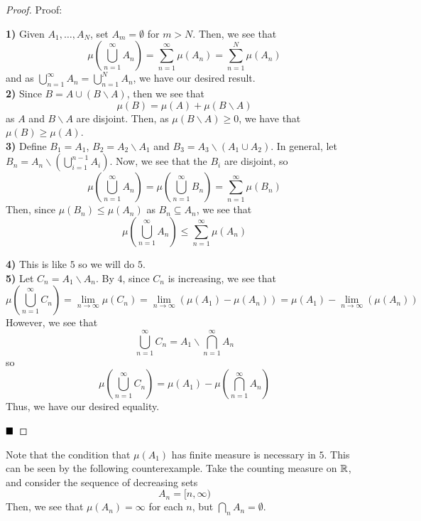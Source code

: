 \begin{proof}{Proof:}
    
    \textbf{1)} Given $A_1, \ldots, A_N$, set $A_m = \emptyset$ for $m > N$. Then, we see that
    \[ \mu\left(\bigcup_{n = 1}^{\infty} A_n\right) = \sum_{n = 1}^{\infty} \mu(A_n) = \sum_{n = 1}^{N} \mu(A_n) \]
    and as $\bigcup_{n = 1}^{\infty} A_n = \bigcup_{n = 1}^{N} A_n$, we have our desired result.\\

    \textbf{2)} Since $B = A \cup (B \backslash A)$, then we see that
    \[ \mu(B) = \mu(A) + \mu(B \backslash A) \]
    as $A$ and $B \backslash A$ are disjoint. Then, as $\mu(B \backslash A) \geq 0$, we have that $\mu(B) \geq \mu(A)$.\\

    \textbf{3)} Define $B_1 = A_1$, $B_2 = A_2 \backslash A_1$ and $B_{3} = A_3 \backslash \left(A_1 \cup A_2\right)$. In general, let $B_{n} = A_n \backslash \left(\bigcup_{i = 1}^{n - 1} A_i\right)$. Now, we see that the $B_{i}$ are disjoint, so
    \[ \mu\left(\bigcup_{n = 1}^{\infty} A_{n}\right) = \mu\left(\bigcup_{n = 1}^{\infty} B_n\right) = \sum_{n = 1}^{\infty} \mu(B_n) \]
    Then, since $\mu(B_n) \leq \mu(A_n)$ as $B_n \subseteq A_n$, we see that
    \[ \mu\left(\bigcup_{n = 1}^{\infty} A_n\right) \leq \sum_{n = 1}^{\infty} \mu(A_n) \]

    \textbf{4)} This is like $5$ so we will do $5$.\\

    \textbf{5)} Let $C_{n} = A_1 \backslash A_n$. By $4$, since $C_{n}$ is increasing, we see that
    \[ \mu\left(\bigcup_{n = 1}^{\infty} C_n\right) = \lim_{n \to \infty} \mu(C_n) = \lim_{n \to \infty} \left( \mu(A_1) - \mu(A_n)\right) = \mu(A_1) - \lim_{n \to \infty}\left(\mu(A_n)\right) \]
    However, we see that
    \[ \bigcup_{n = 1}^{\infty} C_n = A_1 \backslash \bigcap_{n = 1}^{\infty} A_n \]
    so
    \[ \mu\left(\bigcup_{n = 1}^{\infty} C_n\right) = \mu(A_1) - \mu\left(\bigcap_{n = 1}^{\infty} A_n\right) \]
    Thus, we have our desired equality.

    $\qed$
\end{proof}

Note that the condition that $\mu(A_1)$ has finite measure is necessary in $5$. This can be seen by the following counterexample. Take the counting measure on $\mathbb{R}$, and consider the sequence of decreasing sets
\[ A_n = [n, \infty) \]
Then, we see that $\mu(A_n) = \infty$ for each $n$, but $\bigcap_{n} A_n = \emptyset$.

